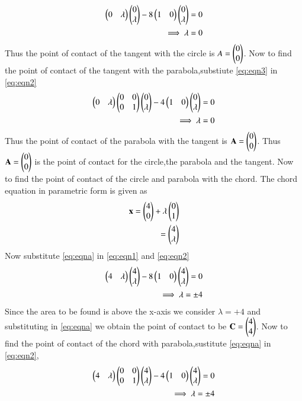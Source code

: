 \documentclass[journal,12pt,twocolumn]{IEEEtran}
\begin{document}
\begin{align}
\begin{pmatrix}0&\lambda\end{pmatrix}\begin{pmatrix}0 \\ \lambda\end{pmatrix}-8\begin{pmatrix}1&0\end{pmatrix}\begin{pmatrix}0 \\ \lambda\end{pmatrix}=0
\\
\implies \lambda=0
\end{align}
Thus the point of contact of the tangent with the circle is $A=\begin{pmatrix}0 \\ 0\end{pmatrix}$.
Now to find the point of contact of the tangent with the parabola,substiute \eqref{eq:eqn3} in \eqref{eq:eqn2}
\begin{align}
    \begin{pmatrix}0&\lambda\end{pmatrix}\begin{pmatrix}0&0 \\ 0&1\end{pmatrix}\begin{pmatrix}0 \\ \lambda\end{pmatrix}-4\begin{pmatrix}1&0\end{pmatrix}\begin{pmatrix}0 \\ \lambda\end{pmatrix}=0
    \\
    \implies \lambda=0
\end{align}
Thus the point of contact of the parabola with the tangent is $\mathbf{A}=\begin{pmatrix}0 \\ 0\end{pmatrix}$.
Thus $\mathbf{A}=\begin{pmatrix}0 \\ 0\end{pmatrix}$ is the point of contact for the circle,the parabola and the tangent.
Now to find the point of contact of the circle and parabola with the chord.
The chord equation in parametric form is given as
\begin{align}
    \mathbf{x}= \begin{pmatrix}4 \\ 0\end{pmatrix} +\lambda\begin{pmatrix}0 \\ 1\end{pmatrix} 
    \\
    = \begin{pmatrix}4 \\ \lambda\end{pmatrix} \label{eq:eqna}
\end{align}
Now substitute \eqref{eq:eqna} in \eqref{eq:eqn1} and \eqref{eq:eqn2}
\begin{align}
\begin{pmatrix}4&\lambda\end{pmatrix}\begin{pmatrix}4 \\ \lambda\end{pmatrix}-8\begin{pmatrix}1&0\end{pmatrix}\begin{pmatrix}4 \\ \lambda\end{pmatrix}=0
\\
\implies \lambda=\pm 4
\end{align}
Since the area to be found is above the x-axis we consider $\lambda = +4$ and substituting in \eqref{eq:eqna} we obtain the point of contact to be
$\mathbf{C}=\begin{pmatrix}4 \\ 4\end{pmatrix}$.
Now to find the point of contact of the chord with parabola,sustitute \eqref{eq:eqna} in \eqref{eq:eqn2},
\begin{align}
    \begin{pmatrix}4&\lambda\end{pmatrix}\begin{pmatrix}0&0 \\ 0&1\end{pmatrix}\begin{pmatrix}4 \\ \lambda\end{pmatrix}-4\begin{pmatrix}1&0\end{pmatrix}\begin{pmatrix}4 \\ \lambda\end{pmatrix}=0
    \\
    \implies \lambda=\pm 4
\end{align}
\end{document}
